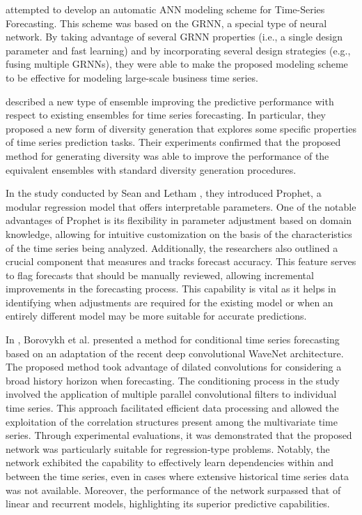 \cite{6210391} attempted to develop an automatic ANN modeling scheme for Time-Series Forecasting.
This scheme was based on the GRNN, a special type of neural network.
By taking advantage of several GRNN properties (i.e., a single design parameter and fast learning) and by incorporating several design strategies (e.g., fusing multiple GRNNs), they were able to make the proposed modeling scheme to be effective for modeling large-scale business time series.

\cite{Oliveira2015} described a new type of ensemble improving the predictive performance with respect to existing ensembles for time series forecasting.
In particular, they proposed a new form of diversity generation that explores some specific properties of time series prediction tasks.
Their experiments confirmed that the proposed method for generating diversity was able to improve the performance of the equivalent ensembles with standard diversity generation procedures.

In the study conducted by Sean and Letham \cite{Sean2017}, they introduced Prophet, a modular regression model that offers interpretable parameters.
One of the notable advantages of Prophet is its flexibility in parameter adjustment based on domain knowledge, allowing for intuitive customization on the basis of the characteristics of the time series being analyzed.
Additionally, the researchers also outlined a crucial component that measures and tracks forecast accuracy.
This feature serves to flag forecasts that should be manually reviewed, allowing incremental improvements in the forecasting process.
This capability is vital as it helps in identifying when adjustments are required for the existing model or when an entirely different model may be more suitable for accurate predictions.

In \cite{Borovykh2017}, Borovykh et al. presented a method for conditional time series forecasting based on an adaptation of the recent deep convolutional WaveNet architecture.
The proposed method took advantage of dilated convolutions for considering a broad history horizon when forecasting.
The conditioning process in the study involved the application of multiple parallel convolutional filters to individual time series.
This approach facilitated efficient data processing and allowed the exploitation of the correlation structures present among the multivariate time series.
Through experimental evaluations, it was demonstrated that the proposed network was particularly suitable for regression-type problems.
Notably, the network exhibited the capability to effectively learn dependencies within and between the time series, even in cases where extensive historical time series data was not available.
Moreover, the performance of the network surpassed that of linear and recurrent models, highlighting its superior predictive capabilities.

